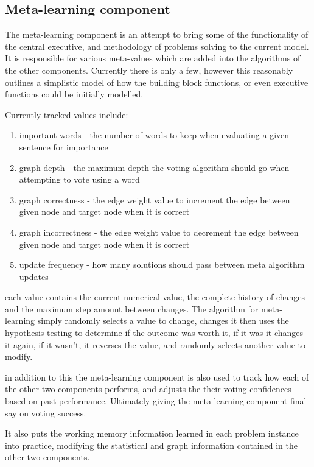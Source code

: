 \subsection{Meta-learning component} The meta-learning component is an attempt
to bring some of the functionality of the central executive, and methodology of
problems solving to the current model. It is responsible for various meta-values
which are added into the algorithms of the other components. Currently there is
only a few, however this reasonably outlines a simplistic model of how the
building block functions, or even executive functions could be initially
modelled.

Currently tracked values include:

\begin{enumerate}     \item important words - the number of words to keep when
evaluating a given sentence for importance     \item graph depth - the maximum
depth the voting algorithm should go when attempting to vote using a word
\item graph correctness - the edge weight value to increment the edge between
given node and target node when it is correct     \item graph incorrectness -
the edge weight value to decrement the edge between given node and target node
when it is correct     \item update frequency - how many solutions should pass
between meta algorithm updates \end{enumerate}

each value contains the current numerical value, the complete history of changes
and the maximum step amount between changes.  The algorithm for meta-learning
simply randomly selects a value to change, changes it then uses the hypothesis
testing to determine if the outcome was worth it, if it was it changes it again,
if it wasn't, it reverses the value, and randomly selects another value to
modify.

in addition to this the meta-learning component is also used to track how each
of the other two components performs, and adjusts the their voting confidences
based on past performance.  Ultimately giving the meta-learning component final
say on voting success.

It also puts the working memory information learned in each problem instance
into practice, modifying the statistical and graph information contained in the
other two components.

